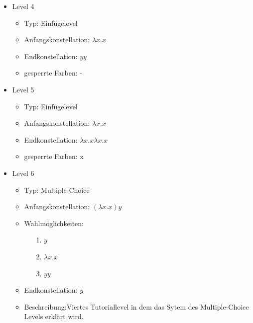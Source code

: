 \begin{itemize}
	\item{Level 4} 
		\begin{itemize}
			\item{Typ:} Einfügelevel
			\item{Anfangskonstellation:} \(\lambda x . x \)    
			\item{Endkonstellation:} \(y y\)
			\item{gesperrte Farben:} - 
		\end{itemize}

	\item{Level 5} 
		\begin{itemize}
			\item{Typ:} Einfügelevel
			\item{Anfangskonstellation:} \(\lambda x . x \)    
			\item{Endkonstellation:}  \(\lambda x . x  \lambda x . x  \)
			\item{gesperrte Farben:} x
		\end{itemize}

	\item{Level 6} 
		\begin{itemize}
			\item{Typ:} Multiple-Choice 
			\item{Anfangskonstellation:} \((\lambda x . x ) y\)    
			\item{Wahlmöglichkeiten:}  
				\begin{itemize}
					\item[1.] \(y\)
					\item[2.] \(\lambda x . x \) 
					\item[3.] \(y y\)
				\end{itemize}
			\item{Endkonstellation:} \(y\)
			\item{Beschreibung:}Viertes Tutoriallevel in dem das Sytem des Multiple-Choice Levels erklärt wird.
		\end{itemize}

\end{itemize}
